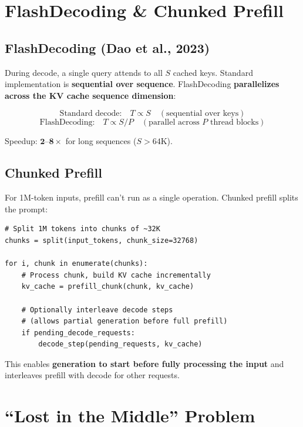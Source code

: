 \documentclass[11pt,a4paper]{article}
\begin{document}
\section{FlashDecoding \& Chunked Prefill}

\subsection{FlashDecoding (Dao et al., 2023)}

During decode, a single query attends to all $S$ cached keys. Standard implementation is \textbf{sequential over sequence}. FlashDecoding \textbf{parallelizes across the KV cache sequence dimension}:

$$\text{Standard decode:} \quad T \propto S \quad (\text{sequential over keys})$$
$$\text{FlashDecoding:} \quad T \propto S / P \quad (\text{parallel across } P \text{ thread blocks})$$

Speedup: $\mathbf{2\text{--}8\times}$ for long sequences ($S > 64\text{K}$).

\subsection{Chunked Prefill}

For 1M-token inputs, prefill can't run as a single operation. Chunked prefill splits the prompt:

\begin{lstlisting}[basicstyle=\ttfamily\small, caption={Chunked Prefill for 1M tokens}]
# Split 1M tokens into chunks of ~32K
chunks = split(input_tokens, chunk_size=32768)

for i, chunk in enumerate(chunks):
    # Process chunk, build KV cache incrementally
    kv_cache = prefill_chunk(chunk, kv_cache)
    
    # Optionally interleave decode steps
    # (allows partial generation before full prefill)
    if pending_decode_requests:
        decode_step(pending_requests, kv_cache)
\end{lstlisting}

This enables \textbf{generation to start before fully processing the input} and interleaves prefill with decode for other requests.

\section{``Lost in the Middle'' Problem}
\end{document}
